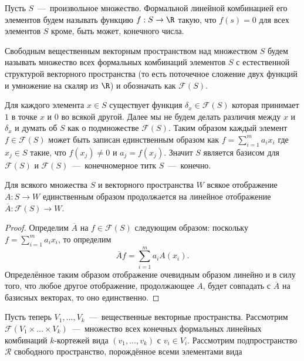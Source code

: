 
Пусть $S$~---~произвольное множество.
Формальной линейной комбинацией его элементов будем называть функцию $f: S \to \R$ такую, что $f(s) = 0$ для всех элементов $S$ кроме, быть может, конечного числа.
\begin{definition}
    Свободным вещественным векторным пространством над множеством $S$ будем называть множество всех формальных комбинаций элементов $S$ с естественной структурой векторного пространства (то есть поточечное сложение двух функций и умножение на скаляр из $\R$) и обозначать как $\mathcal{F}(S)$.
\end{definition}
Для каждого элемента $x \in S$ существует функция $\delta_x \in \mathcal{F}(S)$ которая принимает $1$ в точке $x$ и $0$ во всякой другой.
Далее мы не будем делать различия между $x$ и $\delta_x$ и думать об $S$ как о подмножестве $\mathcal{F}(S)$.
Таким образом каждый элемент $f \in \mathcal{F}(S)$ может быть записан единственным образом как $f = \sum_{i = 1}^m a_i x_i$ где $x_j \in S$ такие, что $f(x_j) \neq 0$ и $a_j = f(x_j)$.
Значит $S$ является базисом для $\mathcal{F}(S)$ и $\mathcal{F}(S)$~---~конечномерное титк $S$~---~конечно.
\begin{proposition}
    Для всякого множества $S$ и векторного пространства $W$ всякое отображение $A: S \to W$ единственным образом продолжается на линейное отображение $\overline{A}: \mathcal{F}(S) \to W$.
\end{proposition}
\begin{proof}
    Определим $\overline{A}$ на $f \in \mathcal{F}(S)$ следующим образом: поскольку $f = \sum\limits_{i = 1}^m a_{i}x_i$, то определим
    \[
        \overline{A}f = \sum\limits_{i = 1}^m a_{i}A(x_i).
    \]
    Определённое таким образом отображение очевидным образом линейно и в силу того, что любое другое отображение, продолжающее $A$, будет совпадать с $\overline{A}$ на базисных векторах, то оно единственно.
\end{proof}
Пусть теперь $V_1, \ldots, V_k$~---~вещественные векторные пространства. Рассмотрим $\mathcal{F}(V_1 \times \ldots \times V_k)$~---~множество всех конечных формальных линейных комбинаций $k$-кортежей вида $(v_1, \ldots, v_k)$ с $v_i \in V_i$.
Рассмотрим подпространство $\mathcal{R}$ свободного пространство, порождённое всеми элементами вида

